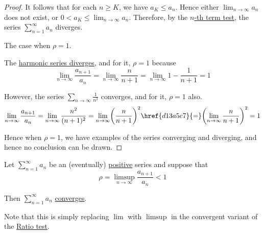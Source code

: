 \begin{proof}
  It follows that for each $n\geq K$, we have $a_K\leq a_n$. Hence either
  $\lim_{n\to\infty}a_n$ does not exist, or $0<a_K\leq\lim_{n\to\infty}a_n$.
  Therefore, by the \href{fa993a6}{$n$-th term test}, the series
  $\sum_{n=1}^\infty a_n$ diverges.

   The case when $\rho=1$.

  The \href{ffaeb85}{harmonic series diverges}, and for it, $\rho=1$ because
  $$
    \lim_{n\to\infty}\frac{a_{n+1}}{a_n}=\lim_{n\to\infty}\frac{n}{n+1}
    =\lim_{n\to\infty}1-\frac1{n+1}=1
  $$

  However, the series \href{e664113}{$\sum_{n\to\infty}\frac1{n^2}$} converges,
  and for it, $\rho=1$ also.
  $$
    \lim_{n\to\infty}\frac{a_{n+1}}{a_n}
    =\lim_{n\to\infty}\frac{n^2}{(n+1)^2}
    =\lim_{n\to\infty}\biggl(\frac{n}{n+1}\biggr)^2
    \href{d13a5e7}{=}\biggl(\lim_{n\to\infty}\frac{n}{n+1}\biggr)^2
    =1
  $$

  Hence when $\rho=1$, we have examples of the series converging and diverging,
  and hence no conclusion can be drawn.
\end{proof}

\label{bac5cd6}

Let $\sum_{n=1}^\infty a_n$ be an (eventually) \href{c09906a}{positive} series
and suppose that
$$
  \rho=\limsup_{n\to\infty}\frac{a_{n+1}}{a_n}<1
$$

Then $\sum_{n=1}^\infty a_n$ \href{f8901df}{converges}.

Note that this is simply replacing $\lim$ with \href{f4f2af4}{$\limsup$} in the
convergent variant of the \href{cb7b15b}{Ratio test}.

